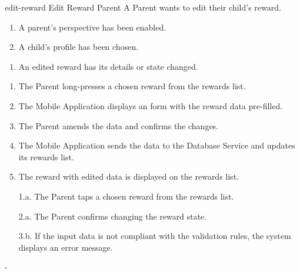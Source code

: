 {edit-reward}
{Edit Reward}
{Parent}
{A Parent wants to edit their child's reward.}
{\begin{enumerate} %
    \item A parent's perspective has been enabled.
    \item A child's profile has been chosen.
\end{enumerate}}
{\begin{enumerate} %
   \item An edited reward has its details or state changed.
\end{enumerate}}
{\begin{enumerate} %
   \item The Parent long-presses a chosen reward from the rewards list.
   \item The Mobile Application displays an  form with the reward data pre-filled.
   \item The Parent amends the data and confirms the changes.
   \item The Mobile Application sends the data to the Database Service and updates its rewards list.
   \item The reward with edited data is displayed on the rewards list.
\end{enumerate}}
{\begin{enumerate} %
    \item[1.a.] The Parent taps a chosen reward from the rewards list.
    \item[2.a.] The Parent confirms changing the reward state.
\end{enumerate}
}
{\begin{enumerate} %
    \item[3.b.] If the input data is not compliant with the validation rules, the system displays an error message.
\end{enumerate}}
{-} %


